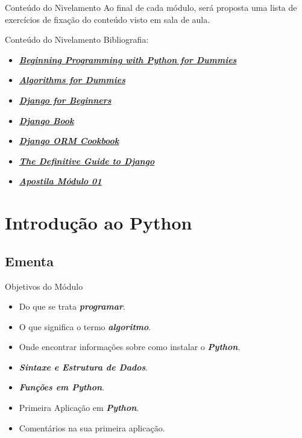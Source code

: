 \documentclass{beamer}
\begin{document}
\begin{frame}{Conteúdo do Nivelamento}
	\label{conteudo_exercicios}
	Ao final de cada módulo, será proposta uma lista de exercícios de fixação do conteúdo visto em sala de aula.
\end{frame}

\begin{frame}{Conteúdo do Nivelamento}
	\label{bibliografia}
	Bibliografia:
	\begin{itemize}
		\item \href{bibliografia/Beginning Programming with Python for Dummies.pdf}{\textbf{\textit{Beginning Programming with Python for Dummies}}}
		\item \href{bibliografia/Algorithms For Dummies.pdf}{\textbf{\textit{Algorithms for Dummies}}}
		\item \href{bibliografia/django-for-beginners-build-websites-with-python-amp-django_compress.pdf}{\textbf{\textit{Django for Beginners}}}
		\item \href{https://django-book.readthedocs.io/en/latest/}{\textbf{\textit{Django Book}}}
		\item \href{https://books.agiliq.com/projects/django-orm-cookbook/en/latest/}{\textbf{\textit{Django ORM Cookbook}}}
		\item \href{bibliografia/The Definitive Guide to Django - Apress.pdf}{\textbf{\textit{The Definitive Guide to Django}}}
		\item \href{bibliografia/apostila_modulo_01.pdf}{\textbf{\textit{Apostila Módulo 01}}}
	\end{itemize}
\end{frame}

\section{Introdução ao Python}
\subsection{Ementa}
\begin{frame}{Objetivos do Módulo}
	\label{objetivos_modulo}
\begin{itemize}
	\item Do que se trata \textbf{\textit{programar}}.
	\item O que significa o termo \textbf{\textit{algoritmo}}.
	\item Onde encontrar informações sobre como instalar o \textbf{\textit{Python}}.
	\item \textbf{\textit{Sintaxe e Estrutura de Dados}}.
	\item \textbf{\textit{Funções em Python}}.
	\item Primeira Aplicação em \textbf{\textit{Python}}.
	\item Comentários na sua primeira aplicação.
\end{itemize}
\end{frame}
\end{document}

